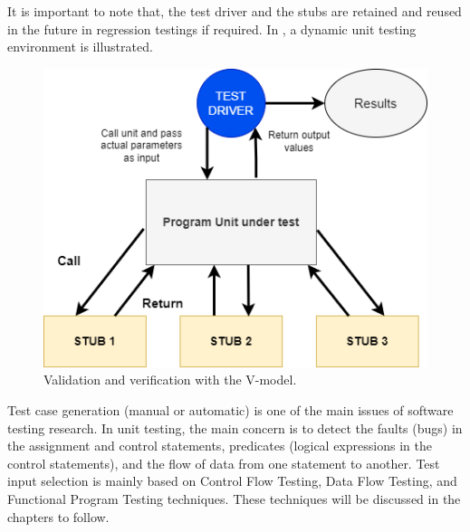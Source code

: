 
It is important to note that, the test driver and the stubs are retained and reused in the future in regression testings if required. In , a dynamic unit testing environment is illustrated.


\begin{figure}[!ht]
    \includegraphics{images/unit-env.png}
    \caption{Validation and verification with the V-model.}
\end{figure}

Test case generation (manual or automatic) is one of the main issues of software testing research. In unit testing, the main concern is to detect the faults (bugs) in the assignment and control statements, predicates (logical expressions in the control statements), and the flow of data from one statement to another. Test input selection is mainly based on Control Flow Testing, Data Flow Testing, and Functional Program Testing techniques. These techniques will be discussed in the chapters to follow. 

